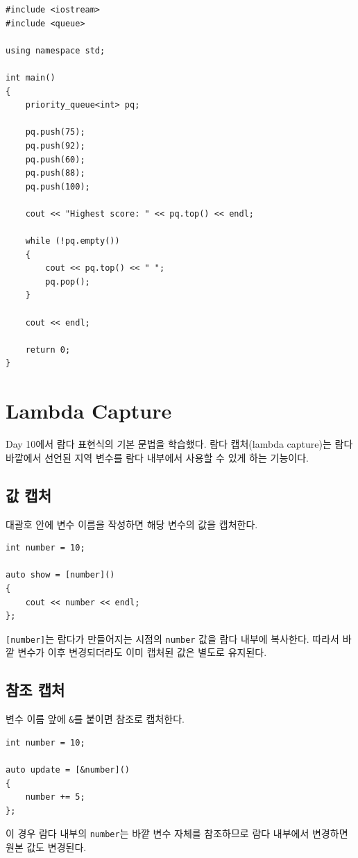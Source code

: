 \documentclass[11pt,a4paper]{article}
\begin{document}
\begin{lstlisting}
#include <iostream>
#include <queue>

using namespace std;

int main()
{
    priority_queue<int> pq;

    pq.push(75);
    pq.push(92);
    pq.push(60);
    pq.push(88);
    pq.push(100);

    cout << "Highest score: " << pq.top() << endl;

    while (!pq.empty())
    {
        cout << pq.top() << " ";
        pq.pop();
    }

    cout << endl;

    return 0;
}
\end{lstlisting}

\section{Lambda Capture}
Day 10에서 람다 표현식의 기본 문법을 학습했다.
람다 캡처(lambda capture)는 람다 바깥에서 선언된 지역 변수를 람다 내부에서 사용할 수 있게 하는 기능이다.

\subsection{값 캡처}
대괄호 안에 변수 이름을 작성하면 해당 변수의 값을 캡처한다.

\begin{lstlisting}
int number = 10;

auto show = [number]()
{
    cout << number << endl;
};
\end{lstlisting}

\texttt{[number]}는 람다가 만들어지는 시점의 \texttt{number} 값을 람다 내부에 복사한다.
따라서 바깥 변수가 이후 변경되더라도 이미 캡처된 값은 별도로 유지된다.

\subsection{참조 캡처}
변수 이름 앞에 \texttt{\&}를 붙이면 참조로 캡처한다.

\begin{lstlisting}
int number = 10;

auto update = [&number]()
{
    number += 5;
};
\end{lstlisting}

이 경우 람다 내부의 \texttt{number}는 바깥 변수 자체를 참조하므로 람다 내부에서 변경하면 원본 값도 변경된다.
\end{document}
